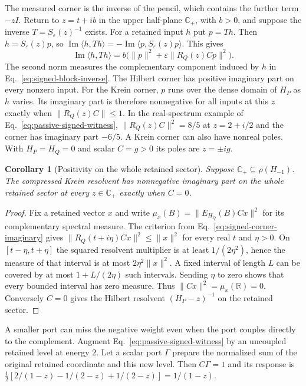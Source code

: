 \documentclass[11pt]{article}
\newtheorem{corollary}[proposition]{Corollary}
\theoremstyle{definition}
\newcommand{\C}{\mathbb C}
\newcommand{\R}{\mathbb R}
\begin{document}
The measured corner is the inverse of the pencil, which contains the further term $-zI$. Return to $z=t+ib$ in the upper half-plane $\C_+$, with $b>0$, and suppose the inverse $T=S_\varepsilon(z)^{-1}$ exists. For a retained input $h$ put $p=Th$. Then $h=S_\varepsilon(z)p$, so $\operatorname{Im}\langle h,Th\rangle=-\operatorname{Im}\langle p,S_\varepsilon(z)p\rangle$. This gives
\begin{equation}
 \operatorname{Im}\langle h,Th\rangle
 =b\bigl(\|p\|^2+\varepsilon\|R_Q(z)Cp\|^2\bigr).
 \label{eq:signed-corner-imaginary}
\end{equation}
The second norm measures the complementary component induced by $h$ in Eq.~\eqref{eq:signed-block-inverse}. The Hilbert corner has positive imaginary part on every nonzero input. For the Krein corner, $p$ runs over the dense domain of $H_P$ as $h$ varies. Its imaginary part is therefore nonnegative for all inputs at this $z$ exactly when $\|R_Q(z)C\|\le1$. In the real-spectrum example of Eq.~\eqref{eq:passive-signed-witness}, $\|R_Q(z)C\|^2=8/5$ at $z=2+i/2$ and the corner has imaginary part $-6/5$. A Krein corner can also have nonreal poles. With $H_P=H_Q=0$ and scalar $C=g>0$ its poles are $z=\pm ig$.

\begin{corollary}[Positivity on the whole retained sector]
\label{cor:signed-full-corner}
Suppose $\C_+\subseteq\rho(H_{-1})$. The compressed Krein resolvent has nonnegative imaginary part on the whole retained sector at every $z\in\C_+$ exactly when $C=0$.
\end{corollary}
\begin{proof}
Fix a retained vector $x$ and write $\mu_x(B)=\|E_{H_Q}(B)Cx\|^2$ for its complementary spectral measure. The criterion from Eq.~\eqref{eq:signed-corner-imaginary} gives $\|R_Q(t+i\eta)Cx\|^2\le\|x\|^2$ for every real $t$ and $\eta>0$. On $[t-\eta,t+\eta]$ the squared resolvent multiplier is at least $1/(2\eta^2)$, hence the measure of that interval is at most $2\eta^2\|x\|^2$. A fixed interval of length $L$ can be covered by at most $1+L/(2\eta)$ such intervals. Sending $\eta$ to zero shows that every bounded interval has zero measure. Thus $\|Cx\|^2=\mu_x(\R)=0$. Conversely $C=0$ gives the Hilbert resolvent $(H_P-z)^{-1}$ on the retained sector.
\end{proof}

A smaller port can miss the negative weight even when the port couples directly to the complement. Augment Eq.~\eqref{eq:passive-signed-witness} by an uncoupled retained level at energy $2$. Let a scalar port $\Gamma$ prepare the normalized sum of the original retained coordinate and this new level. Then $C\Gamma=1$ and its response is $\tfrac12[2/(1-z)-1/(2-z)+1/(2-z)]=1/(1-z)$.
\end{document}
